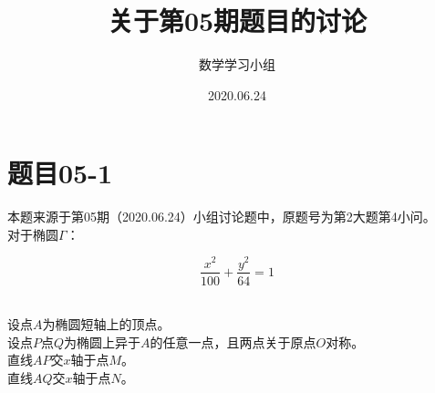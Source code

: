 \documentclass[UTF8]{ctexart}
\title{关于第05期题目的讨论}
\author{数学学习小组}
\date{2020.06.24}
\begin{document}
\maketitle

\newpage

\tableofcontents

\newpage

\setlength{\parindent}{0pt}
\setlength{\columnseprule}{0.4pt}
\setlength{\columnsep}{40pt}

\section{题目05-1}
    本题来源于第05期（2020.06.24）小组讨论题中，原题号为第2大题第4小问。\\[3mm]
    对于椭圆$\Gamma$：
    \begin{large}
        \begin{equation*}
            \frac{x^2}{100}+\frac{y^2}{64}=1
        \end{equation*}
    \end{large}\\
    设点$A$为椭圆短轴上的顶点。\\[3mm]
    设点$P$点$Q$为椭圆上异于$A$的任意一点，且两点关于原点$O$对称。\\[3mm]
    直线$AP$交$x$轴于点$M$。\\[3mm]
    直线$AQ$交$x$轴于点$N$。
\end{document}
